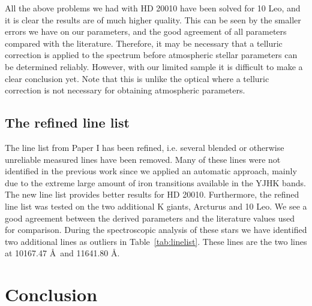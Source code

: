 \documentclass[a4paper,fleqn,usenatbib]{mnras}
\begin{document}
All the above problems we had with HD 20010 have been solved for 10 Leo, and it
is clear the results are of much higher quality. This can be seen by the smaller
errors we have on our parameters, and the good agreement of all parameters
compared with the literature. Therefore, it may be necessary that a telluric
correction is applied to the spectrum before atmospheric stellar parameters can
be determined reliably. However, with our limited sample it is difficult to make
a clear conclusion yet. Note that this is unlike the optical where a telluric
correction is not necessary for obtaining atmospheric parameters.


\subsection{The refined line list}

The line list from Paper I has been refined, i.e. several blended or otherwise unreliable measured
lines have been removed. Many of these lines were not identified in the previous work since we
applied an automatic approach, mainly due to the extreme large amount of iron transitions available
in the YJHK bands. The new line list provides better results for HD 20010. Furthermore, the refined 
line list was tested on the two additional K giants, Arcturus and 10 Leo. We see a good agreement between 
the derived parameters and the literature values used for comparison. During the spectroscopic analysis of 
these stars we have identified two additional lines as outliers in Table~\ref{tab:linelist}. These lines 
are the two  lines at 10167.47 \AA\ and 11641.80 \AA.


\section{Conclusion}
\label{sec:conclusion}
\end{document}
